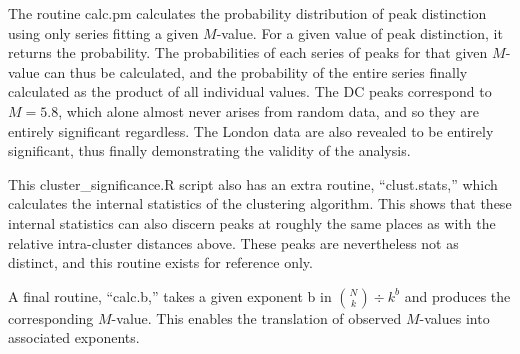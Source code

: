 \documentclass[a4paper,oneside]{article}
\begin{document}
The routine calc.pm calculates the probability distribution of peak distinction using only series fitting a given $M$-value. For a given value
of peak distinction, it returns the probability. The probabilities of each series of peaks for that given $M$-value can thus be calculated, and
the probability of the entire series finally calculated as the product of all individual values. The DC peaks correspond to $M=5.8$, which alone
almost never arises from random data, and so they are entirely significant regardless. The London data are also revealed to be entirely
significant, thus finally demonstrating the validity of the analysis.

This cluster\_significance.R script also has an extra routine, ``clust.stats,'' which calculates the internal statistics of the
clustering algorithm. This shows that these internal statistics can also discern peaks at roughly the same places as with the relative
intra-cluster distances above. These peaks are nevertheless not as distinct, and this routine exists for reference only.

A final routine, ``calc.b,'' takes a given exponent b in $\binom{N}{k} \div k ^ b$ and produces the corresponding $M$-value. This enables the
translation of observed $M$-values into associated exponents.
\end{document}
